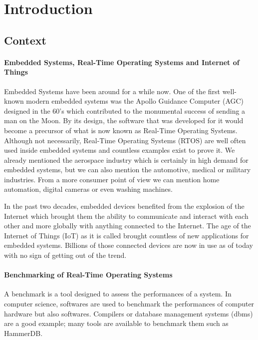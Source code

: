 \chapter*{Introduction}
%
%
\section*{Context}

\subsubsection*{Embedded Systems, Real-Time Operating Systems and Internet of Things}

Embedded Systems have been around for a while now.
One of the first well-known modern embedded systems was the Apollo Guidance Computer (AGC) designed in the 60's
    which contributed to the monumental success of sending a man on the Moon.
By its design, the software that was developed for it would become a precursor of what is now known as Real-Time Operating Systems.
Although not necessarily, Real-Time Operating Systems (RTOS) are well often used inside embedded systems and countless examples exist to prove it.
We already mentioned the aerospace industry which is certainly in high demand for embedded systems, 
    but we can also mention the automotive, medical or military industries.
From a more consumer point of view we can mention home automation, digital cameras or even washing machines.

In the past two decades, embedded devices benefited from the explosion of the Internet which brought them 
    the ability to communicate and interact with each other and more globally with anything connected to the Internet.
The age of the Internet of Things (IoT) as it is called brought countless of new applications for embedded systems.
Billions of those connected devices are now in use as of today with no sign of getting out of the trend.

\subsubsection*{Benchmarking of Real-Time Operating Systems}

A benchmark is a tool designed to assess the performances of a system.
In computer science, softwares are used to benchmark the performances of computer hardware but also softwares.
Compilers or database management systems (dbms) are a good example; many tools are available to benchmark them such as HammerDB.

